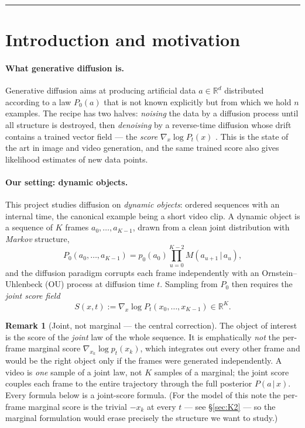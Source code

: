\documentclass[11pt]{article}
\theoremstyle{definition}
\newtheorem{remark}{Remark}
\newcommand{\R}{\mathbb{R}}
\newcommand{\given}{\,|\,}
\begin{document}
\tableofcontents
\medskip
\hrule
\medskip

\section{Introduction and motivation}\label{sec:intro}

\paragraph{What generative diffusion is.}
Generative diffusion aims at producing artificial data $a\in\R^d$ distributed
according to a law $P_0(a)$ that is not known explicitly but from which we
hold $n$ examples. The recipe has two halves: \emph{noising} the data by a
diffusion process until all structure is destroyed, then \emph{denoising} by a
reverse-time diffusion whose drift contains a trained vector field --- the
\emph{score} $\nabla_x\log P_t(x)$
\citep{song2021scorebased,vincent2011connection}. This is
the state of the art in image and video generation, and the same trained score
also gives likelihood estimates of new data points.

\paragraph{Our setting: dynamic objects.}
This project studies diffusion on \emph{dynamic objects}: ordered sequences
with an internal time, the canonical example being a short video clip. A
dynamic object is a sequence of $K$ frames $a_0,\dots,a_{K-1}$, drawn from a
clean joint distribution with \emph{Markov} structure,
\begin{equation}\label{eq:chain-prior}
  P_0(a_0,\dots,a_{K-1})=p_0(a_0)\prod_{u=0}^{K-2}M(a_{u+1}\given a_u),
\end{equation}
and the diffusion paradigm corrupts each frame independently with an
Ornstein--Uhlenbeck (OU) process at diffusion time $t$. Sampling from $P_0$
then requires the \emph{joint score field}
\begin{equation}\label{eq:joint-score-def}
  S(x,t):=\nabla_x\log P_t(x_0,\dots,x_{K-1})\in\R^{K}.
\end{equation}

\begin{remark}[Joint, not marginal --- the central correction]\label{rmk:joint}
The object of interest is the score of the \emph{joint} law of the whole
sequence. It is emphatically \emph{not} the per-frame marginal score
$\nabla_{x_k}\log p_t(x_k)$, which integrates out every other frame and would
be the right object only if the frames were generated independently. A video
is \emph{one} sample of a joint law, not $K$ samples of a marginal; the joint
score couples each frame to the entire trajectory through the full posterior
$P(a\given x)$. Every formula below is a joint-score formula. (For the
model of this note the per-frame marginal score is the trivial $-x_k$ at every
$t$ --- see \S\ref{sec:K2} --- so the marginal formulation would erase
precisely the structure we want to study.)
\end{remark}
\end{document}
